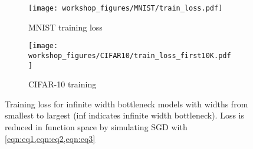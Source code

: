 \documentclass{article}
\theoremstyle{definition}
\theoremstyle{remark}
\renewcommand{\[}{\begin{eqnarray}}
\renewcommand{\]}{\end{eqnarray}}
\renewcommand{\[}{\begin{eqnarray}}
\renewcommand{\]}{\end{eqnarray}}
\begin{document}
\label{expt:data:mnist}
\begin{figure}[!t]
    \begin{subfigure}[b]{\columnwidth}
        \texttt{[image: workshop\_figures/MNIST/train\_loss.pdf]}
        \caption{MNIST training loss}
        \label{fig:mnist_lr5k_metrics:train_loss_main}
    \end{subfigure}
    \begin{subfigure}[b]{\columnwidth}
        \texttt{[image: workshop\_figures/CIFAR10/train\_loss\_first10K.pdf]}
        \caption{CIFAR-10 training}
        \label{fig:cifar10_lr1k_metrics:train_loss_main}
    \end{subfigure}

    \caption{{Training loss for infinite width bottleneck models with widths from smallest to largest (inf indicates infinite width bottleneck). Loss is reduced in function space by simulating SGD with \cref{eqn:eq1,eqn:eq2,eqn:eq3}}}%
    \label{fig:mnist_cifar_train_loss}
\end{figure}

\end{document}

